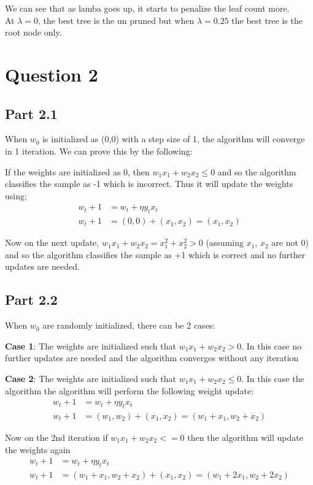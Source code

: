 \documentclass{article}
\begin{document}
\noindent We can see that as lamba goes up, it starts to penalize the leaf count more.\\
At $\lambda = 0$, the best tree is the un pruned but when $\lambda = 0.25$
the best tree is the root node only.

\section{Question 2}

\subsection{Part 2.1}
When $w_0$ is initialized as (0,0) with a step size of 1, the algorithm will converge in 1 iteration.
We can prove this by the following:

\noindent If the weights are initialized as 0, then $w_1x_1 + w_2x_2 \leq 0$ and so the algorithm
classifies the sample as -1 which is incorrect. Thus it will update the weights using:
\begin{align*}
    w_t+1 &= w_t + \eta y_t x_t \\
    w_t+1 &= (0,0) + (x_1, x_2) = (x_1, x_2)
\end{align*}

\noindent Now on the next update, $w_1x_1 + w_2x_2 = x_1^2 + x_2^2 > 0$ (assuming $x_1$, $x_2$ are not 0) 
and so the algorithm classifies the sample as +1 which is correct and no further updates are needed.

\subsection{Part 2.2}
When $w_0$ are randomly initialized, there can be 2 cases:

\noindent \textbf{Case 1}: The weights are initialized such that $w_1x_1 + w_2x_2 > 0$. 
In this case no further updates are needed and the algorithm converges without any iteration

\noindent \textbf{Case 2}: The weights are initialized such that $w_1x_1 + w_2x_2 \leq 0$. 
In this case the algorithm the algorithm will perform the following weight update:
\begin{align*}
    w_t+1 &= w_t + \eta y_t x_t \\
    w_t+1 &= (w_1, w_2) + (x_1, x_2) = (w_1 + x_1, w_2 + x_2)
\end{align*}

\noindent Now on the 2nd iteration if $w_1x_1 + w_2x_2 <= 0$ then the algorithm will update 
the weights again
\begin{align*}
    w_t+1 &= w_t + \eta y_t x_t \\
    w_t+1 &= (w_1 + x_1, w_2 + x_2) + (x_1, x_2) = (w_1 + 2x_1, w_2 + 2x_2)
\end{align*}
\end{document}
